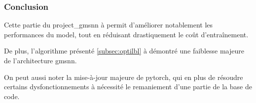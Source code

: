 \subsubsection{Conclusion}
Cette partie du \gls{project_gmsnn} à permit d'améliorer notablement les performances du \gls{model}, tout en réduisant drastiquement le coût d'entraînement.%

De plus, l'algorithme présenté \autoref{subsec:optilbl} à démontré une faiblesse majeure de l'architecture \gls{gmsnn}.

On peut aussi noter la mise-à-jour majeure de \gls{pytorch}, qui en plus de résoudre certains dysfonctionnements à nécessité le remaniement d'une partie de la base de code.
